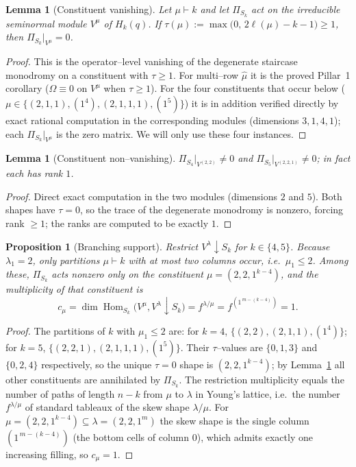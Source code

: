 \documentclass[11pt]{article}
\newtheorem{lemma}[theorem]{Lemma}
\newtheorem{proposition}[theorem]{Proposition}
\theoremstyle{definition}
\DeclareMathOperator{\Hom}{Hom}
\newcommand{\la}{\lambda}
\newcommand{\Vl}{V^{\la}}
\begin{document}
\begin{lemma}[Constituent vanishing]\label{lem:const}
Let $\mu\vdash k$ and let $\Pi_{S_k}$ act on the irreducible seminormal module $V^\mu$ of
$H_k(q)$. If $\tau(\mu):=\max\!\big(0,\,2\ell(\mu)-k-1\big)\ge1$, then
$\Pi_{S_k}\big|_{V^\mu}=0$.
\end{lemma}

\begin{proof}
This is the operator--level vanishing of the degenerate staircase monodromy on a
constituent with $\tau\ge1$. For multi--row $\hat\mu$ it is the proved Pillar~1 corollary
($\Omega\equiv0$ on $V^\mu$ when $\tau\ge1$). For the four constituents that occur below
($\mu\in\{(2,1,1),(1^4),(2,1,1,1),(1^5)\}$) it is in addition verified directly by exact
rational computation in the corresponding modules (dimensions $3,1,4,1$); each
$\Pi_{S_k}\big|_{V^\mu}$ is the zero matrix. We will only use these four instances.
\end{proof}

\begin{lemma}[Constituent non--vanishing]\label{lem:nonvan}
$\Pi_{S_4}\big|_{V^{(2,2)}}\neq0$ and $\Pi_{S_5}\big|_{V^{(2,2,1)}}\neq0$; in fact each has
rank $1$.
\end{lemma}

\begin{proof}
Direct exact computation in the two modules (dimensions $2$ and $5$). Both shapes have
$\tau=0$, so the trace of the degenerate monodromy is nonzero, forcing rank $\ge1$; the
ranks are computed to be exactly $1$.
\end{proof}

\begin{proposition}[Branching support]\label{prop:branch}
Restrict $\Vl\!\downarrow\! S_k$ for $k\in\{4,5\}$. Because $\la_1=2$, only partitions
$\mu\vdash k$ with at most two columns occur, i.e.\ $\mu_1\le2$. Among these,
$\Pi_{S_k}$ acts nonzero only on the constituent $\mu=(2,2,1^{k-4})$, and the multiplicity
of that constituent is
\[
c_\mu=\dim\Hom_{S_k}\!\big(V^\mu,\Vl\!\downarrow\! S_k\big)=f^{\la/\mu}
=f^{(1^{\,m-(k-4)})}=1 .
\]
\end{proposition}

\begin{proof}
The partitions of $k$ with $\mu_1\le2$ are: for $k=4$, $\{(2,2),(2,1,1),(1^4)\}$; for
$k=5$, $\{(2,2,1),(2,1,1,1),(1^5)\}$. Their $\tau$--values are $\{0,1,3\}$ and
$\{0,2,4\}$ respectively, so the unique $\tau=0$ shape is $(2,2,1^{k-4})$; by
Lemma~\ref{lem:const} all other constituents are annihilated by $\Pi_{S_k}$. The
restriction multiplicity equals the number of paths of length $n-k$ from $\mu$ to $\la$ in
Young's lattice, i.e.\ the number $f^{\la/\mu}$ of standard tableaux of the skew shape
$\la/\mu$. For $\mu=(2,2,1^{k-4})\subseteq\la=(2,2,1^m)$ the skew shape is the single
column $(1^{\,m-(k-4)})$ (the bottom cells of column $0$), which admits exactly one
increasing filling, so $c_\mu=1$.
\end{proof}
\end{document}
